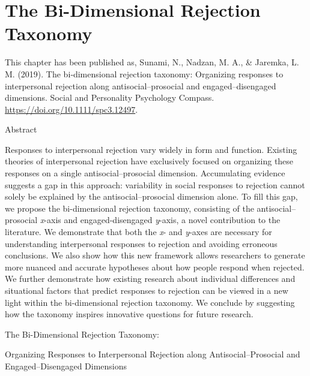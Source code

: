 \documentclass[
]{udthesis}
\begin{document}
\chapter{The Bi-Dimensional Rejection Taxonomy}\label{the-bi-dimensional-rejection-taxonomy}

This chapter has been published as, Sunami, N., Nadzan, M. A., \&
Jaremka, L. M. (2019). The bi‐dimensional rejection taxonomy: Organizing
responses to interpersonal rejection along antisocial--prosocial and
engaged--disengaged dimensions. Social and Personality Psychology
Compass. \url{https://doi.org/10.1111/spc3.12497}.

\begin{center}

Abstract

\end{center}

Responses to interpersonal rejection vary widely in form and function.
Existing theories of interpersonal rejection have exclusively focused on
organizing these responses on a single antisocial--prosocial dimension.
Accumulating evidence suggests a gap in this approach: variability in
social responses to rejection cannot solely be explained by the
antisocial--prosocial dimension alone. To fill this gap, we propose the
bi-dimensional rejection taxonomy, consisting of the
antisocial--prosocial \emph{x}-axis and engaged-disengaged \emph{y}-axis, a novel
contribution to the literature. We demonstrate that both the \emph{x}- and
\emph{y}-axes are necessary for understanding interpersonal responses to
rejection and avoiding erroneous conclusions. We also show how this new
framework allows researchers to generate more nuanced and accurate
hypotheses about how people respond when rejected. We further
demonstrate how existing research about individual differences and
situational factors that predict responses to rejection can be viewed in
a new light within the bi-dimensional rejection taxonomy. We conclude by
suggesting how the taxonomy inspires innovative questions for future
research.

\newpage

\begin{center}

The Bi-Dimensional Rejection Taxonomy:

Organizing Responses to Interpersonal Rejection along
Antisocial--Prosocial and Engaged--Disengaged Dimensions

\end{center}
\end{document}
